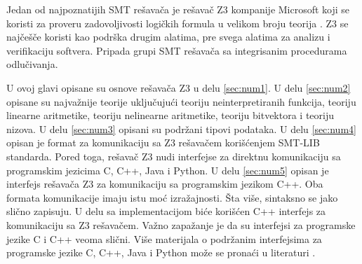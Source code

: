 \documentclass[12pt,oneside]{memoir}
\begin{document}
Jedan od najpoznatijih SMT rešavača je rešavač Z3 kompanije Microsoft koji se koristi za proveru zadovoljivosti logičkih formula u velikom broju teorija \cite{EfficientSMTSolver}. Z3 se najčešče koristi kao podrška drugim alatima, pre svega alatima za analizu i verifikaciju softvera. Pripada grupi SMT rešavača sa integrisanim procedurama odlučivanja.
\par
U ovoj glavi opisane su osnove rešavača Z3 u delu \ref{sec:num1}. U delu \ref{sec:num2} opisane su najvažnije teorije uključujući teoriju neinterpretiranih funkcija, teoriju linearne aritmetike, teoriju nelinearne aritmetike, teoriju bitvektora i teoriju nizova. U delu \ref{sec:num3} opisani su  podržani tipovi podataka. U delu \ref{sec:num4} opisan je format za komunikaciju sa Z3 rešavačem korišćenjem SMT-LIB standarda. Pored toga, rešavač Z3 nudi interfejse za direktnu komunikaciju sa programskim jezicima C, C++, Java i Python. U delu \ref{sec:num5} opisan je interfejs rešavača Z3 za komunikaciju sa programskim jezikom C++. Oba formata komunikacije imaju istu moć izražajnosti. Šta više, sintaksno se jako slično zapisuju. U delu sa implementacijom biće korišćen C++ interfejs za komunikaciju sa Z3 rešavačem. Važno zapažanje je da su interfejsi za programske jezike C i C++ veoma slični. Više materijala o podržanim interfejsima za programske jezike C, C++, Java i Python može se pronaći u literaturi \cite{api}.
\end{document}
